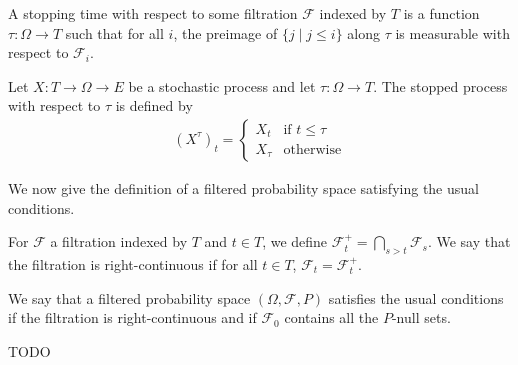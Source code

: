 \begin{definition}\label{def:IsStoppingTime}
  \mathlibok
A stopping time with respect to some filtration $\mathcal{F}$ indexed by $T$ is a function $\tau : \Omega \to T$ such that for all $i$, the preimage of $\{j \mid j \le i\}$ along $\tau$ is measurable with respect to $\mathcal{F}_i$.
\end{definition}


\begin{definition}\label{def:stoppedProcess}
  \mathlibok
Let $X : T \to \Omega \to E$ be a stochastic process and let $\tau : \Omega \to T$.
The stopped process with respect to $\tau$ is defined by
\begin{align*}
  (X^{\tau})_t = \begin{cases}
    X_t & \text{if } t \le \tau \\
    X_{\tau} & \text{otherwise}
  \end{cases}
\end{align*}
\end{definition}


We now give the definition of a filtered probability space satisfying the usual conditions.


\begin{definition}\label{def:rightContinuous}
For $\mathcal{F}$ a filtration indexed by $T$ and $t \in T$, we define $\mathcal{F}^+_t = \bigcap_{s > t} \mathcal{F}_s$.
We say that the filtration is right-continuous if for all $t \in T$, $\mathcal{F}_t = \mathcal{F}^+_t$.
\end{definition}


\begin{definition}\label{def:usualConditions}
We say that a filtered probability space $(\Omega, \mathcal{F}, P)$ satisfies the usual conditions if the filtration is right-continuous and if $\mathcal{F}_0$ contains all the $P$-null sets.
\end{definition}


\begin{definition}\label{def:predictable}
TODO
\end{definition}
